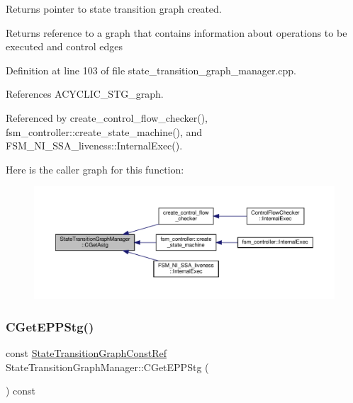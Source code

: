 Returns pointer to state transition graph created. 

\begin{DoxyReturn}{Returns}
reference to a graph that contains information about operations to be executed and control edges 
\end{DoxyReturn}


Definition at line 103 of file state\+\_\+transition\+\_\+graph\+\_\+manager.\+cpp.



References A\+C\+Y\+C\+L\+I\+C\+\_\+\+S\+T\+G\+\_\+graph.



Referenced by create\+\_\+control\+\_\+flow\+\_\+checker(), fsm\+\_\+controller\+::create\+\_\+state\+\_\+machine(), and F\+S\+M\+\_\+\+N\+I\+\_\+\+S\+S\+A\+\_\+liveness\+::\+Internal\+Exec().

Here is the caller graph for this function\+:
\nopagebreak
\begin{figure}[H]
\begin{center}
\leavevmode
\includegraphics[width=350pt]{d9/dfd/classStateTransitionGraphManager_acfc0d7f26c027841313d410893d4fddc_icgraph}
\end{center}
\end{figure}
\mbox{\label{classStateTransitionGraphManager_a1bc8860568f2b3038bfd26c0b30558d8}} 
\subsubsection{\texorpdfstring{C\+Get\+E\+P\+P\+Stg()}{CGetEPPStg()}}
{\footnotesize\ttfamily const \hyperlink{state__transition__graph_8hpp_aa722f3ba42caaaafcacdec07925f6b06}{State\+Transition\+Graph\+Const\+Ref} State\+Transition\+Graph\+Manager\+::\+C\+Get\+E\+P\+P\+Stg (\begin{DoxyParamCaption}{ }\end{DoxyParamCaption}) const}



